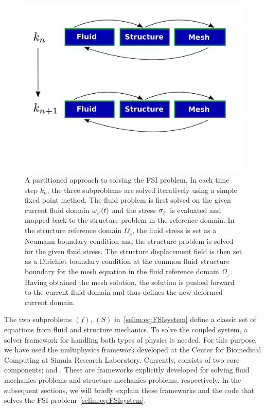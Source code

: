 \begin{figure}[tbp!]
  \begin{center}
    \includegraphics[width=\largefig]{chapters/selim/pdf/primal.pdf}
    \caption{A partitioned approach to solving the FSI problem. In each
      time step $k_n$, the three subproblems are solved iteratively
      using a simple fixed point method. The fluid problem is first
      solved on the given current fluid domain $\omega_{_{F}}(t)$ and the stress
      $\sigma_{_{F}}$ is evaluated and mapped back to the
      structure problem in the reference domain. In the structure
      reference domain $\Omega_{_{S}}$, the fluid stress is set as a
      Neumann boundary condition and the structure problem is solved for the
      given fluid stress. The structure displacement field is then set
      as a Dirichlet boundary condition at the common fluid--structure
      boundary for the mesh equation in the fluid reference domain
      $\Omega_{_{F}}$. Having obtained the mesh solution, the solution
      is pushed forward to the current fluid domain and thus defines the
      new deformed current domain.}
    \label{selim:fig:fp}
  \end{center}
\end{figure}

The two subproblems $(f)$, $(S)$ in~\eqref{selim:eq:FSIsystem} define
a classic set of equations from fluid and structure mechanics. To
solve the coupled system, a solver framework for handling both types
of physics is needed. For this purpose, we have used the multiphysics
framework  developed at the Center for Biomedical
Computing at Simula Research Laboratory. Currently, 
consists of two core components;  and .
These are frameworks explicitly developed for solving fluid mechanics
problems and structure mechanics problems, respectively.  In the
subsequent sections, we will briefly explain these frameworks and the
code that solves the FSI problem~\eqref{selim:eq:FSIsystem}.


